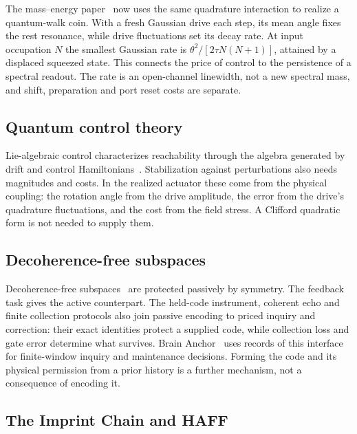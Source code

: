 \documentclass[aps,pre,onecolumn,superscriptaddress,floatfix,longbibliography]{revtex4-2}
\begin{document}
The mass--energy paper~\cite{Liu2026QRAIF_ME} now uses the same
quadrature interaction to realize a quantum-walk coin. With a fresh
Gaussian drive each step, its mean angle fixes the rest resonance,
while drive fluctuations set its decay rate. At input occupation $N$
the smallest Gaussian rate is $\theta^2/[2\tau N(N+1)]$, attained by
a displaced squeezed state. This connects the price of control to
the persistence of a spectral readout. The rate is an open-channel
linewidth, not a new spectral mass, and shift, preparation and port
reset costs are separate.

\subsection{Quantum control theory}

Lie-algebraic control characterizes reachability through the algebra generated by drift and control Hamiltonians~\cite{WisemanMilburn2009}. Stabilization against perturbations also needs magnitudes and costs. In the realized actuator these come from the physical coupling: the rotation angle from the drive amplitude, the error from the drive's quadrature fluctuations, and the cost from the field stress. A Clifford quadratic form is not needed to supply them.

\subsection{Decoherence-free subspaces}

Decoherence-free subspaces~\cite{Zanardi2001,Lidar2003} are protected passively by symmetry. The feedback task gives the active counterpart. The held-code instrument, coherent echo and finite collection protocols also join passive encoding to priced inquiry and correction: their exact identities protect a supplied code, while collection loss and gate error determine what survives. Brain Anchor~\cite{Liu2026Brain} uses records of this interface for finite-window inquiry and maintenance decisions. Forming the code and its physical permission from a prior history is a further mechanism, not a consequence of encoding it.

\subsection{The Imprint Chain and HAFF}
\end{document}
